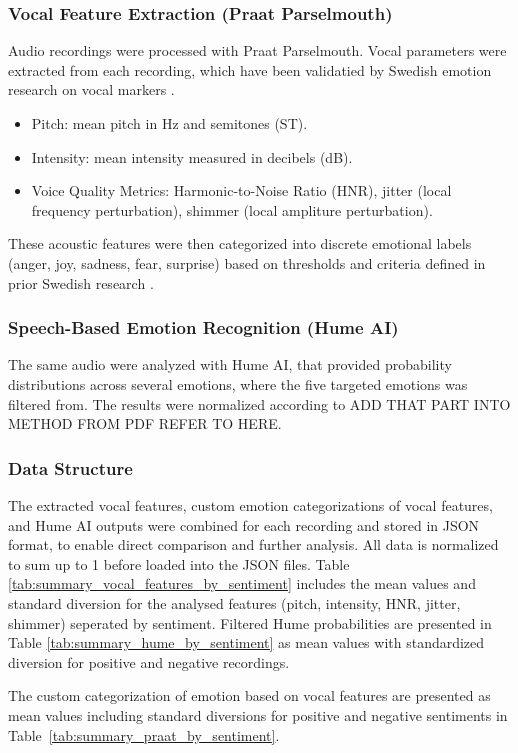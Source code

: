 \subsubsection{Vocal Feature Extraction (Praat Parselmouth)}
Audio recordings were processed with Praat Parselmouth. Vocal parameters were extracted from each recording, which have been validatied by Swedish emotion research on vocal markers \autocite{Ekberg2023}. 
\begin{itemize}
    \item Pitch: mean pitch in Hz and semitones (ST). 
    \item Intensity: mean intensity measured in decibels (dB). 
    \item Voice Quality Metrics: Harmonic-to-Noise Ratio (HNR), jitter (local frequency perturbation), shimmer (local ampliture perturbation). 
\end{itemize}
These acoustic features were then categorized into discrete emotional labels (anger, joy, sadness, fear, surprise) based on thresholds and criteria defined in prior Swedish research \autocite{Ekberg2023}. 

\subsubsection{Speech-Based Emotion Recognition (Hume AI)}
The same audio were analyzed with Hume AI, that provided probability distributions across several emotions, where the five targeted emotions was filtered from. 
The results were normalized according to ADD THAT PART INTO METHOD FROM PDF REFER TO HERE. 

\subsubsection{Data Structure}
The extracted vocal features, custom emotion categorizations of vocal features, and Hume AI outputs were combined for each recording and stored in JSON format, to enable direct comparison and further analysis. All data is normalized to sum up to 1 before loaded into the JSON files. 
Table \ref{tab:summary_vocal_features_by_sentiment} includes the mean values and standard diversion for the analysed features (pitch, intensity, HNR, jitter, shimmer) seperated by sentiment. 
Filtered Hume probabilities are presented in Table \ref{tab:summary_hume_by_sentiment} as mean values with standardized diversion for positive and negative recordings.

The custom categorization of emotion based on vocal features are presented as mean values including standard diversions for positive and negative sentiments in Table~\ref{tab:summary_praat_by_sentiment}. 

